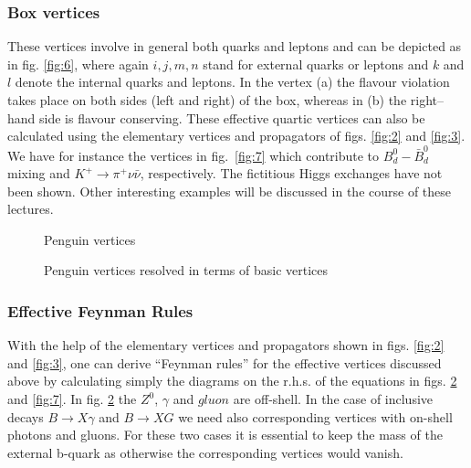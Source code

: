 \documentclass[12pt]{article}
\begin{document}
\begin{itemize}
\subsubsection{Box vertices}
These vertices involve in general both quarks and leptons and can be
depicted as in fig. \ref{fig:6},
where again $i,j,m,n$ stand for external quarks or leptons and $k$ and
$l$ denote the internal quarks and leptons. In the vertex (a) the
flavour violation takes place on both sides (left and right) of the
box, whereas in (b) the right--hand side is flavour conserving. These
effective quartic vertices can also be calculated using the elementary
vertices and propagators of figs. \ref{fig:2} and \ref{fig:3}. We have
for instance the vertices in fig.~\ref{fig:7}
which contribute to $B_d^0-\bar B_d^0$ mixing and $K^+\to\pi^+\nu\bar\nu$, 
respectively.
The fictitious Higgs exchanges have not been shown.
Other interesting examples will be discussed in the course of these
lectures. \par
\begin{figure}[hbt]
\centerline{
\epsfysize=1.6in
}
\vspace{0.08in}
\caption[]{
Penguin vertices
\label{fig:4}}
\end{figure}

\begin{figure}[htb]
\centerline{
\epsfysize=3.2in
}
\caption[]{
Penguin vertices resolved in terms of basic vertices
\label{fig:5}}
\end{figure}

\subsubsection{Effective Feynman Rules}
With the help of the elementary vertices and propagators 
shown in figs. \ref{fig:2} and \ref{fig:3}, 
one can  derive
``Feynman rules'' for the effective vertices discussed above by
calculating simply the diagrams on the r.h.s. of the equations in
figs. \ref{fig:5} and \ref{fig:7}. In fig. \ref{fig:5} 
the $Z^0$, $\gamma$ and $gluon$ are
off-shell. In the case of inclusive decays $B \to X\gamma$ and
$B \to X G$ we need also corresponding vertices with on-shell
photons and gluons. For these two cases it is essential to
keep the mass of the external b-quark as otherwise the corresponding 
vertices would vanish.  


\end{itemize}
\end{document}
